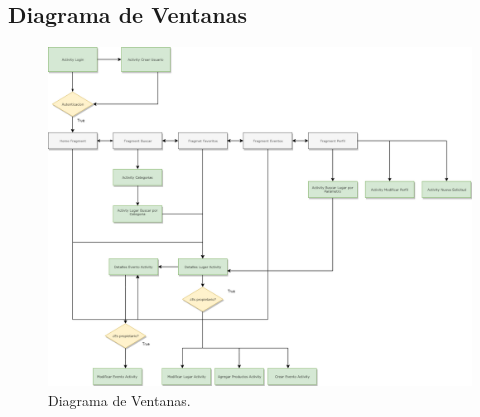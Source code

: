 \documentclass[12pt,letterpaper,openany]{book}
\begin{document}
\subsection{Diagrama de Ventanas}
\begin{figure}[H]
\begin{center}
\includegraphics[width=13cm]{./imagenes/diagrama_ventanas}
\caption{Diagrama de Ventanas.}
\end{center}
\end{figure}
\end{document}
